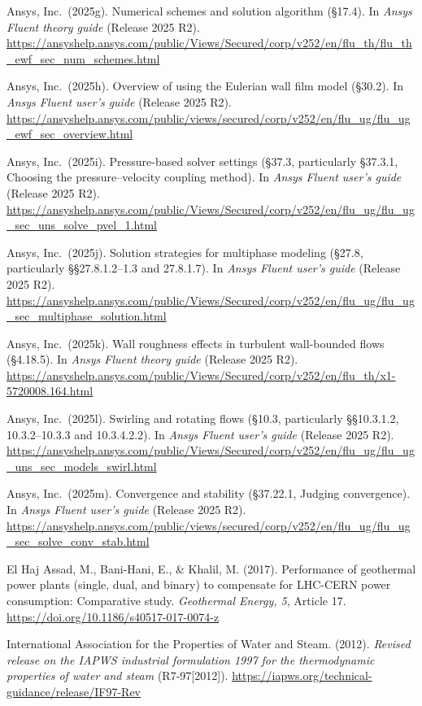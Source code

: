 \documentclass[12pt]{article}
\begin{document}
Ansys, Inc.~(2025g). Numerical schemes and solution algorithm (§17.4). In \emph{Ansys Fluent theory guide} (Release 2025 R2). \url{https://ansyshelp.ansys.com/public/Views/Secured/corp/v252/en/flu_th/flu_th_ewf_sec_num_schemes.html}

Ansys, Inc.~(2025h). Overview of using the Eulerian wall film model (§30.2). In \emph{Ansys Fluent user's guide} (Release 2025 R2). \url{https://ansyshelp.ansys.com/public/views/secured/corp/v252/en/flu_ug/flu_ug_ewf_sec_overview.html}

Ansys, Inc.~(2025i). Pressure-based solver settings (§37.3, particularly §37.3.1, Choosing the pressure--velocity coupling method). In \emph{Ansys Fluent user's guide} (Release 2025 R2). \url{https://ansyshelp.ansys.com/public/Views/Secured/corp/v252/en/flu_ug/flu_ug_sec_uns_solve_pvel_1.html}

Ansys, Inc.~(2025j). Solution strategies for multiphase modeling (§27.8, particularly §§27.8.1.2--1.3 and 27.8.1.7). In \emph{Ansys Fluent user's guide} (Release 2025 R2). \url{https://ansyshelp.ansys.com/public/Views/Secured/corp/v252/en/flu_ug/flu_ug_sec_multiphase_solution.html}

Ansys, Inc.~(2025k). Wall roughness effects in turbulent wall-bounded flows (§4.18.5). In \emph{Ansys Fluent theory guide} (Release 2025 R2). \url{https://ansyshelp.ansys.com/public/Views/Secured/corp/v252/en/flu_th/x1-5720008.164.html}

Ansys, Inc.~(2025l). Swirling and rotating flows (§10.3, particularly §§10.3.1.2, 10.3.2--10.3.3 and 10.3.4.2.2). In \emph{Ansys Fluent user's guide} (Release 2025 R2). \url{https://ansyshelp.ansys.com/public/Views/Secured/corp/v252/en/flu_ug/flu_ug_uns_sec_models_swirl.html}

Ansys, Inc.~(2025m). Convergence and stability (§37.22.1, Judging convergence). In \emph{Ansys Fluent user's guide} (Release 2025 R2). \url{https://ansyshelp.ansys.com/public/views/secured/corp/v252/en/flu_ug/flu_ug_sec_solve_conv_stab.html}

El Haj Assad, M., Bani-Hani, E., \& Khalil, M. (2017). Performance of geothermal power plants (single, dual, and binary) to compensate for LHC-CERN power consumption: Comparative study. \emph{Geothermal Energy, 5}, Article 17. \url{https://doi.org/10.1186/s40517-017-0074-z}

International Association for the Properties of Water and Steam. (2012). \emph{Revised release on the IAPWS industrial formulation 1997 for the thermodynamic properties of water and steam} (R7-97{[}2012{]}). \url{https://iapws.org/technical-guidance/release/IF97-Rev}
\end{document}
